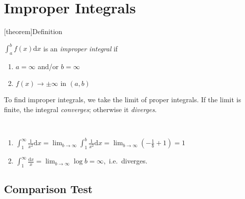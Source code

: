 \documentclass[12pt]{report}
\theoremstyle{definition}
\begin{document}
\section{Improper Integrals}
[theorem]{Definition}
\begin{improper integral}
    $\int_a^{b} f(x) \mathrm{d}x$ is an \emph{improper integral} if
    \begin{enumerate}[label = (\roman*)]
        \item $a = \infty$ and/or $b = \infty$
        \item $f(x) \rightarrow \pm \infty$ in $(a,b)$
    \end{enumerate}
\end{improper integral}
To find improper integrals, we take the limit of proper integrals. If the limit is finite, the integral \emph{converges};
otherwise it \emph{diverges}.
\begin{ex}
    \,

    \begin{enumerate}[label = (\roman*)]
        \item $\int_1^{\infty} \frac{1}{x^{2}} \mathrm{d}x 
            = \lim_{b\rightarrow \infty} \int_1^{b} \frac{1}{x^{2}} \mathrm{d}x 
            = \lim_{b\rightarrow\infty} (-\frac{1}{b} + 1) = 1$
        \item $\int_1^{\infty} \frac{\mathrm{d}x}{x} = \lim_{b \rightarrow \infty} \log{b} = \infty$, \,i.e.\ diverges.
    \end{enumerate}
\end{ex}

\subsection{Comparison Test}
\,
\end{document}
